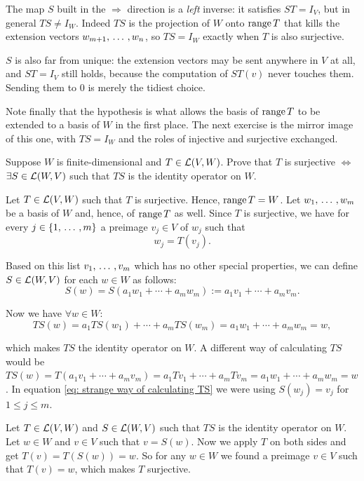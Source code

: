\begin{ainote}
  The map $S$ built in the $\Rightarrow$ direction is a \emph{left} inverse: it satisfies $ST = I_V$, but in general $TS \neq I_W$. Indeed $TS$ is the projection of $W$ onto $\operatorname{range} T$ that kills the extension vectors $w_{m+1}, {\, \ldots \,\,}, w_n$, so $TS = I_W$ exactly when $T$ is also surjective.

  $S$ is also far from unique: the extension vectors may be sent anywhere in $V$ at all, and $ST = I_V$ still holds, because the computation of $ST(v)$ never touches them. Sending them to $0$ is merely the tidiest choice.

  Note finally that the hypothesis  is what allows the basis of $\operatorname{range} T$ to be extended to a basis of $W$ in the first place. The next exercise is the mirror image of this one, with $TS = I_W$ and the roles of injective and surjective exchanged.
\end{ainote}

\begin{xrcs}
  Suppose $W$ is finite-dimensional and $T \in \mathcal{L} (V,W)$. Prove that $T$ is surjective $\iff$ $\exists S \in \mathcal{L} (W,V)$ such that $TS$ is the identity operator on $W$.

  \begin{xprf}
    \Rightarrowdirection Let $T \in \mathcal{L} (V,W)$ such that $T$ is surjective. Hence, $\operatorname{range} T = W$. Let $w_1, {\, \ldots \,\,}, w_m$ be a basis of $W$ and, hence, of $\operatorname{range} T$ as well. Since $T$ is surjective, we have for every $j \in \{1, {\, \ldots \,\,}, m\}$ a preimage $v_j \in V$ of $w_j$ such that
    \begin{equation}
      w_j = T(v_j).
    \end{equation}

    Based on this list $v_1, {\, \ldots \,\,}, v_m$ which has no other special properties, we can define $S \in \mathcal{L} (W,V)$ for each $w \in W$ as follows:
    \begin{equation}
      S(w) = S(a_1 w_1 + \cdots + a_m w_m) := a_1 v_1 + \cdots + a_m v_m.
    \end{equation}

    Now we have $\forall w \in W$:
    \begin{equation}
      \label{eq: strange way of calculating TS}
      TS(w) = a_1 TS(w_1) + \cdots + a_m TS (w_m) = a_1 w_1 + \cdots + a_m w_m = w,
    \end{equation}

    which makes $TS$ the identity operator on $W$. A different way of calculating $TS$ would be $TS(w) = T(a_1 v_1 + \cdots + a_m v_m) = a_1 T v_1 + \cdots + a_m T v_m = a_1 w_1 + \cdots + a_m w_m = w$. In equation \eqref{eq: strange way of calculating TS} we were using $S(w_j) = v_j$ for $1 \leq j \leq m$.

    \Leftarrowdirection Let $T \in \mathcal{L} (V,W)$ and $S \in \mathcal{L}(W,V)$ such that $TS$ is the identity operator on $W$. Let $w \in W$ and $v \in V$ such that $v=S(w)$. Now we apply $T$ on both sides and get $T(v) = T(S(w)) = w$. So for any $w \in W$ we found a preimage $v \in V$ such that $T(v) = w$, which makes $T$ surjective.
  \end{xprf}
\end{xrcs}


